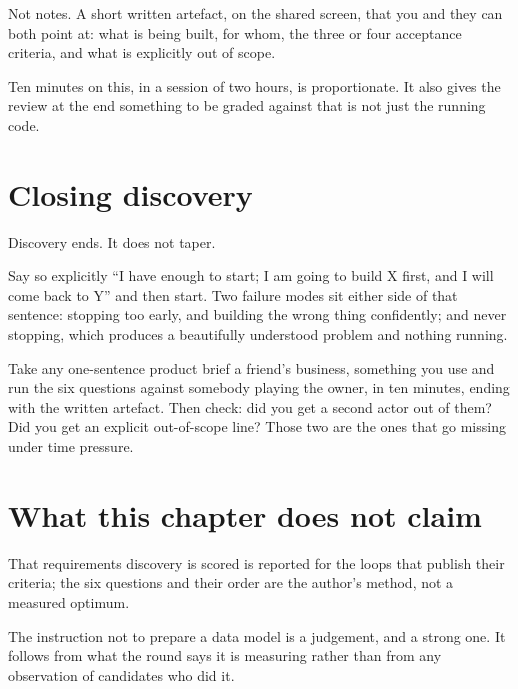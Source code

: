 Not notes. A short written artefact, on the shared screen, that you and they
can both point at: what is being built, for whom, the three or four acceptance
criteria, and what is explicitly out of scope.


Ten minutes on this, in a session of two hours, is proportionate. It also gives
the review at the end something to be graded against that is not just the
running code.

\section{Closing discovery}

Discovery ends. It does not taper.

Say so explicitly \dash{} ``I have enough to start; I am going to build X
first, and I will come back to Y'' \dash{} and then start. Two failure modes
sit either side of that sentence: stopping too early, and building the wrong
thing confidently; and never stopping, which produces a beautifully understood
problem and nothing running.


\begin{drill}
Take any one-sentence product brief \dash{} a friend's business, something you
use \dash{} and run the six questions against somebody playing the owner, in
ten minutes, ending with the written artefact. Then check: did you get a second
actor out of them? Did you get an explicit out-of-scope line? Those two are the
ones that go missing under time pressure.
\end{drill}

\section*{What this chapter does not claim}

That requirements discovery is scored is reported for the loops that publish
their criteria; the six questions and their order are the author's method, not
a measured optimum.

The instruction not to prepare a data model is a judgement, and a strong one.
It follows from what the round says it is measuring rather than from any
observation of candidates who did it.
